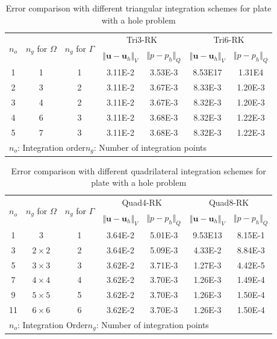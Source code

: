 \begin{table}[H]
\centering
\caption{Error comparison with different triangular integration schemes for plate with a hole problem}
\label{tab1}
\begin{tabular}{ccccccc}
\toprule
\multirow{2}{*}{$n_o$} & \multirow{2}{*}{$n_g$ for $\Omega$} & \multirow{2}{*}{$n_g$ for $\Gamma$} & \multicolumn{2}{c}{Tri3-RK} & \multicolumn{2}{c}{Tri6-RK} \\
\shortstack{} & \shortstack{} & \shortstack{} & $\Vert \boldsymbol u-\boldsymbol u_h \Vert_V$ & $\Vert p-p_h \Vert_Q$ & $\Vert \boldsymbol u-\boldsymbol u_h \Vert_V$ & $\Vert p-p_h \Vert_Q$ \\
\midrule
1 & 1 & 1 & 3.11E-2 & 3.53E-3 & 8.53E17 & 1.31E4 \\
2 & 3 & 2 & 3.11E-2 & 3.67E-3 & 8.33E-3 & 1.20E-3 \\
3 & 4 & 2 & 3.11E-2 & 3.67E-3 & 8.32E-3 & 1.20E-3 \\
4 & 6 & 3 & 3.11E-2 & 3.68E-3 & 8.32E-3 & 1.22E-3 \\
5 & 7 & 3 & 3.11E-2 & 3.68E-3 & 8.32E-3 & 1.22E-3 \\
\multicolumn{7}{l}{\footnotesize{$n_o$: Integration order\quad $n_g$: Number of integration points}} \\
\bottomrule
\end{tabular}
\end{table}

\begin{table}[H]
\centering
\caption{Error comparison with different quadrilateral integration schemes for plate with a hole problem}
\label{tab2}
\begin{tabular}{ccccccc}
\toprule
\multirow{2}{*}{$n_o$} & \multirow{2}{*}{$n_g$ for $\Omega$} & \multirow{2}{*}{$n_g$ for $\Gamma$} & \multicolumn{2}{c}{Quad4-RK} & \multicolumn{2}{c}{Quad8-RK} \\
\shortstack{} & \shortstack{} & \shortstack{} & $\Vert \boldsymbol u-\boldsymbol u_h \Vert_V$ & $\Vert p-p_h \Vert_Q$ & $\Vert \boldsymbol u-\boldsymbol u_h \Vert_V$ & $\Vert p-p_h \Vert_Q$ \\
\midrule
1 & 3 & 1 & 3.64E-2 & 5.01E-3 & 9.53E13 & 8.15E-1 \\
3 & $2\times2$ & 2 & 3.64E-2 & 5.09E-3 & 4.33E-2 & 8.84E-3 \\
5 & $3\times3$ & 3 & 3.62E-2 & 3.71E-3 & 1.27E-3 & 4.42E-5 \\
7 & $4\times4$ & 4 & 3.62E-2 & 3.70E-3 & 1.26E-3 & 1.49E-4 \\
9 & $5\times5$ & 5 & 3.62E-2 & 3.70E-3 & 1.26E-3 & 1.50E-4 \\
11 & $6\times6$ & 6 & 3.62E-2 & 3.70E-3 & 1.26E-3 & 1.50E-4 \\
\multicolumn{7}{l}{\footnotesize{$n_o$: Integration Order\quad $n_g$: Number of integration points}} \\
\bottomrule
\end{tabular}
\end{table}

